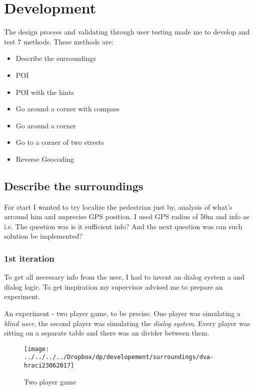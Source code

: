	\chapter{Development}
		The design process and validating through user testing made me to develop and test 7 methods. These methods are:
		\begin{multicols}{2}
			\begin{itemize}
				\item Describe the surroundings
				\item POI
				\item POI with the hints
				\item Go around a corner with compass
				\item Go around a corner
				\item Go to a corner of two streets
				\item Reverse Geocoding
			\end{itemize}	
		\end{multicols}
		
		 
	
		\section{Describe the surroundings}
			For start I wanted to try localize the pedestrian just by, analysis of what's arround him and unprecise GPS position. I used GPS radius of 50m  and info as i.e.  The question was is it sufficient info? And the next question was can such solution be implemented?
			\subsection{1st iteration}
				\label{sec:surroundings-frist-iter}
				To get all necessary info from the user, I had to invent an dialog system a and dialog logic. To get inspiration my supervisor advised me to prepare an experiment.
				
				An experiment - two player game, to be precise. One player was simulating a \emph{blind user}, the second player was simulating the \emph{dialog system}. Every player was sitting on a separate table and there was an divider between them.
				
				\begin{figure}[th]
					\centering
					\texttt{[image: ../../../../Dropbox/dp/developement/surroundings/dva-hraci23062017]}
					\caption{Two player game}
					\label{fig:two-players}
				\end{figure}
			
